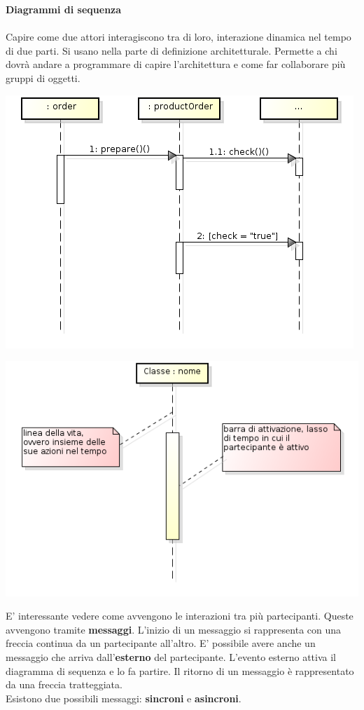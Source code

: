 \textbf{Diagrammi di sequenza}\\\\

Capire come due attori interagiscono tra di loro, interazione dinamica nel tempo di due parti. Si usano nella parte di definizione architetturale. Permette a chi dovrà andare a programmare di capire l'architettura e come far collaborare più gruppi di oggetti.

\begin{center}

\includegraphics[width=0.75\columnwidth]{img4} %

\end{center}

\begin{center}

\includegraphics[width=0.75\columnwidth]{img6} %

\end{center}

E' interessante vedere come avvengono le interazioni tra più partecipanti. Queste avvengono tramite \textbf{messaggi}. L'inizio di un messaggio si rappresenta con una freccia continua da un partecipante all'altro. E' possibile avere anche un messaggio che arriva dall'\textbf{esterno} del partecipante. L'evento esterno attiva il diagramma di sequenza e lo fa partire. Il ritorno di un messaggio è rappresentato da una freccia tratteggiata.\\
Esistono due possibili messaggi:  \textbf{sincroni} e \textbf{asincroni}.

